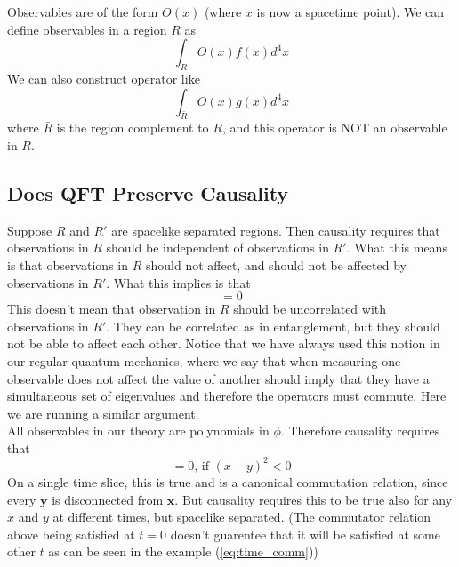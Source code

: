 \documentclass[11pt, notitlepage]{report}
\numberwithin{equation}{section}
\begin{document}
    Observables are of the form \(O(x)\) (where \(x\) is now a spacetime point). We can define observables in a region \(R\) as 
    \begin{equation}
        \int_R O(x) f(x) d^4x
    \end{equation}
    We can also construct operator like 
    \begin{equation}
        \int_{\bar{R}} O(x) g(x) d^4x
    \end{equation}
    where \(\bar{R}\) is the region complement to \(R\), and this operator is NOT an observable in \(R\).\\

    \subsection{Does QFT Preserve Causality}

    Suppose \(R\) and \(R'\) are spacelike separated regions. Then causality requires that observations in \(R\) should be independent of observations in \(R'\). What this means is that observations in \(R\) should not affect, and should not be affected by observations in \(R'\). What this implies is that 
    \begin{equation}
        [O(R) , \tilde O(R')] = 0
    \end{equation}
    This doesn't mean that observation in \(R\) should be uncorrelated with observations in \(R'\). They can be correlated as in entanglement, but they should not be able to affect each other. Notice that we have always used this notion in our regular quantum mechanics, where we say that when measuring one observable does not affect the value of another should imply that they have a simultaneous set of eigenvalues and therefore the operators must commute. Here we are running a similar argument. \\

    All observables in our theory are polynomials in \(\phi\). Therefore causality requires that 
    \begin{equation}
        [\phi(x), \phi(y)] = 0\text{, if }(x-y)^2 <0
    \end{equation}
    On a single time slice, this is true and is a canonical commutation relation, since every \(\textbf{y}\) is disconnected from \(\textbf{x}\). But causality requires this to be true also for any \(x\) and \(y\) at different times, but spacelike separated. (The commutator relation above being satisfied at \(t=0\) doesn't guarentee that it will be satisfied at some other \(t\) as can be seen in the example (\ref{eq:time_comm}))\\
\end{document}
